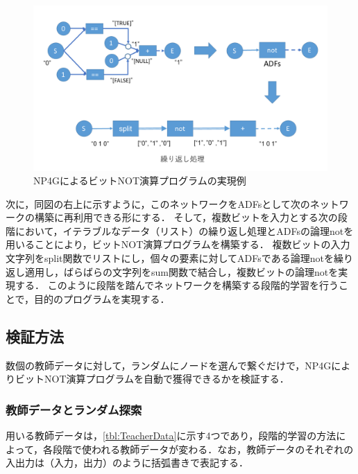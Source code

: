 \documentclass[exploratorypaper]{jsaiart} %
\begin{document}
\begin{figure}[t]
    \begin{center}
        \includegraphics[width=150mm]{bitwise_not.png}
    \end{center}
    \capwidth=130mm %
    \caption{NP4GによるビットNOT演算プログラムの実現例}
    \label{fig:bitwise_not}
\end{figure}

次に，同図の右上に示すように，このネットワークをADFsとして次のネットワークの構築に再利用できる形にする．
そして，複数ビットを入力とする次の段階において，イテラブルなデータ（リスト）の繰り返し処理とADFsの論理notを用いることにより，ビットNOT演算プログラムを構築する．
複数ビットの入力文字列をsplit関数でリストにし，個々の要素に対してADFsである論理notを繰り返し適用し，ばらばらの文字列をsum関数で結合し，複数ビットの論理notを実現する．
このように段階を踏んでネットワークを構築する段階的学習を行うことで，目的のプログラムを実現する．

\subsection{検証方法}
数個の教師データに対して，ランダムにノードを選んで繋ぐだけで，NP4GによりビットNOT演算プログラムを自動で獲得できるかを検証する．

\subsubsection{教師データとランダム探索}
用いる教師データは，\ref{tbl:TeacherData}に示す4つであり，段階的学習の方法によって，各段階で使われる教師データが変わる．なお，教師データのそれぞれの入出力は（入力，出力）のように括弧書きで表記する．
\end{document}
